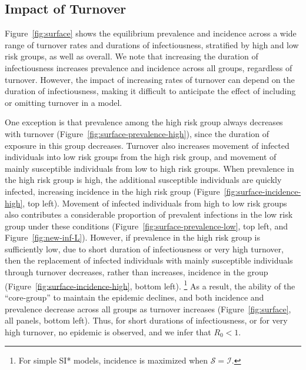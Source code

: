 \subsection{Impact of Turnover}\label{ss:res-turnover}
Figure~\ref{fig:surface} shows the equilibrium prevalence and incidence
across a wide range of turnover rates and durations of infectiousness,
stratified by high and low risk groups, as well as overall.
We note that increasing the duration of infectiousness
increases prevalence and incidence across all groups, regardless of turnover.
However, the impact of increasing rates of turnover
can depend on the duration of infectiousness,
making it difficult to anticipate the effect of including or omitting turnover in a model.
\par
One exception is that prevalence among the high risk group
always decreases with turnover
(Figure~\ref{fig:surface-prevalence-high}),
since the duration of exposure in this group decreases.
Turnover also increases movement of infected individuals
into low risk groups from the high risk group,
and movement of mainly susceptible individuals from low to high risk groups.
When prevalence in the high risk group is high,
the additional susceptible individuals are quickly infected,
increasing incidence in the high risk group
(Figure~\ref{fig:surface-incidence-high}, top left).
Movement of infected individuals from high to low risk groups also contributes
a considerable proportion of prevalent infections in the low risk group under these conditions
(Figure~\ref{fig:surface-prevalence-low}, top left, and Figure~\ref{fig:new-inf-L}).
However, if prevalence in the high risk group is sufficiently low,
due to short duration of infectiousness or very high turnover,
then the replacement of infected individuals with mainly susceptible individuals through turnover
decreases, rather than increases, incidence in the group
(Figure~\ref{fig:surface-incidence-high}, bottom left).%
\footnote{For simple SI* models, incidence is maximized when $\mathcal{S} = \mathcal{I}$.}
As a result, the ability of the ``core-group'' to maintain the epidemic declines,
and both incidence and prevalence decrease across all groups as turnover increases
(Figure~\ref{fig:surface}, all panels, bottom left).
Thus, for short durations of infectiousness, or for very high turnover,
no epidemic is observed, and we infer that $R_0 < 1$.
